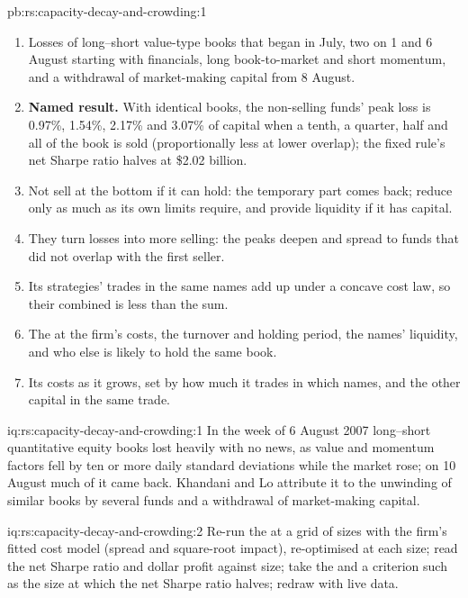 \begin{solution}{pb:rs:capacity-decay-and-crowding:1}
\begin{enumerate}
1.42\% and momentum 1.15\%.
\item Losses of long--short value-type books that began in July, two  on 1 and 6 August starting with financials, long book-to-market and short momentum,
and a withdrawal of market-making capital from 8 August.
\item \textbf{Named result.} With identical books, the non-selling funds' peak loss is 0.97\%, 1.54\%, 2.17\% and 3.07\% of capital when a tenth, a quarter, half and
all of the book is sold (proportionally less at lower overlap); the fixed rule's net Sharpe ratio halves at \$2.02 billion.
\item Not sell at the bottom if it can hold: the temporary part comes back; reduce only as much as its own limits require, and provide liquidity if it has capital.
\item They turn losses into more selling: the peaks deepen and spread to funds that did not overlap with the first seller.
\item Its strategies' trades in the same names add up under a concave cost law, so their combined  is less than the sum.
\item The  at the firm's costs, the turnover and holding period, the names' liquidity, and who else is likely to hold the same book.
\item Its costs as it grows, set by how much it trades in which names, and the other capital in the same trade.
\end{enumerate}
\end{solution}

\begin{solution}{iq:rs:capacity-decay-and-crowding:1}
In the week of 6 August 2007 long--short quantitative equity books lost heavily with no news, as value and momentum factors fell by ten or more daily standard
deviations while the market rose; on 10 August much of it came back. Khandani and Lo attribute it to the unwinding of similar books by several funds and a
withdrawal of market-making capital.
\end{solution}

\begin{solution}{iq:rs:capacity-decay-and-crowding:2}
Re-run the  at a grid of sizes with the firm's fitted cost model (spread and square-root impact), re-optimised at each size; read the net Sharpe ratio and
dollar profit against size; take the  and a criterion such as the size at which the net Sharpe ratio halves; redraw with live data.
\end{solution}

